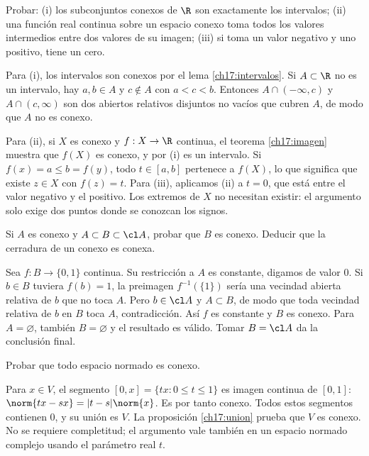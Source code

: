 \begin{ejercicio}
Probar: (i) los subconjuntos conexos de $\R$ son exactamente los intervalos; (ii) una función real continua sobre un espacio conexo toma todos los valores intermedios entre dos valores de su imagen; (iii) si toma un valor negativo y uno positivo, tiene un cero.
\end{ejercicio}
\begin{solucion}
Para (i), los intervalos son conexos por el lema \ref{ch17:intervalos}. Si $A\subset\R$ no es un intervalo, hay $a,b\in A$ y $c\notin A$ con $a<c<b$. Entonces $A\cap(-\infty,c)$ y $A\cap(c,\infty)$ son dos abiertos relativos disjuntos no vacíos que cubren $A$, de modo que $A$ no es conexo.

Para (ii), si $X$ es conexo y $f:X\to\R$ continua, el teorema \ref{ch17:imagen} muestra que $f(X)$ es conexo, y por (i) es un intervalo. Si $f(x)=a\le b=f(y)$, todo $t\in[a,b]$ pertenece a $f(X)$, lo que significa que existe $z\in X$ con $f(z)=t$. Para (iii), aplicamos (ii) a $t=0$, que está entre el valor negativo y el positivo. Los extremos de $X$ no necesitan existir: el argumento solo exige dos puntos donde se conozcan los signos.
\end{solucion}

\begin{ejercicio}
Si $A$ es conexo y $A\subset B\subset\cl A$, probar que $B$ es conexo. Deducir que la cerradura de un conexo es conexa.
\end{ejercicio}
\begin{solucion}
Sea $f:B\to\{0,1\}$ continua. Su restricción a $A$ es constante, digamos de valor $0$. Si $b\in B$ tuviera $f(b)=1$, la preimagen $f^{-1}(\{1\})$ sería una vecindad abierta relativa de $b$ que no toca $A$. Pero $b\in\cl A$ y $A\subset B$, de modo que toda vecindad relativa de $b$ en $B$ toca $A$, contradicción. Así $f$ es constante y $B$ es conexo. Para $A=\varnothing$, también $B=\varnothing$ y el resultado es válido. Tomar $B=\cl A$ da la conclusión final.
\end{solucion}

\begin{ejercicio}
Probar que todo espacio normado es conexo.
\end{ejercicio}
\begin{solucion}
Para $x\in V$, el segmento $[0,x]=\{tx:0\le t\le1\}$ es imagen continua de $[0,1]$: $\norm{tx-sx}=|t-s|\norm{x}$. Es por tanto conexo. Todos estos segmentos contienen $0$, y su unión es $V$. La proposición \ref{ch17:union} prueba que $V$ es conexo. No se requiere completitud; el argumento vale también en un espacio normado complejo usando el parámetro real $t$.
\end{solucion}

